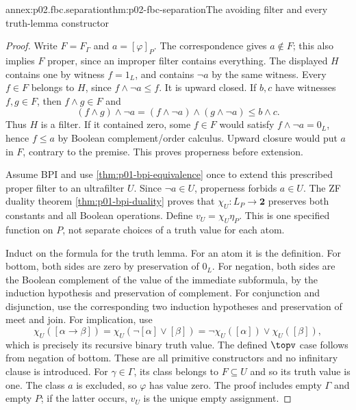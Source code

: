\begin{annexitem}{annex:p02.fbc.separation}{thm:p02-fbc-separation}{The avoiding filter and every truth-lemma constructor}
\begin{proof}
Write \(F=F_\Gamma\) and \(a=[\varphi]_P\).
The correspondence gives \(a\notin F\); this also implies \(F\)
proper, since an improper filter contains everything.
The displayed \(H\) contains one by witness \(f=1_L\), and contains
\(\neg a\) by the same witness. Every \(f\in F\) belongs to \(H\),
since \(f\wedge\neg a\leq f\).
It is upward closed. If \(b,c\) have witnesses \(f,g\in F\),
then \(f\wedge g\in F\) and
\[
 (f\wedge g)\wedge\neg a
        =(f\wedge\neg a)\wedge(g\wedge\neg a)\leq b\wedge c .
\]
Thus \(H\) is a filter.
If it contained zero, some \(f\in F\) would satisfy
\(f\wedge\neg a=0_L\), hence \(f\leq a\) by Boolean
complement/order calculus. Upward closure would put \(a\) in \(F\),
contrary to the premise. This proves properness before extension.

Assume BPI and use \cref{thm:p01-bpi-equivalence} once to extend
this prescribed proper filter to an ultrafilter \(U\).
Since \(\neg a\in U\), properness forbids \(a\in U\).
The ZF duality theorem \cref{thm:p01-bpi-duality} proves that
\(\chi_U:L_P\to\mathbf2\) preserves both constants and all
Boolean operations. Define \(v_U=\chi_U\eta_P\).
This is one specified function on \(P\), not separate choices
of a truth value for each atom.

Induct on the formula for the truth lemma.
For an atom it is the definition.
For bottom, both sides are zero by preservation of \(0_L\).
For negation, both sides are the Boolean complement of the value
of the immediate subformula, by the induction hypothesis and
preservation of complement.
For conjunction and disjunction, use the corresponding two
induction hypotheses and preservation of meet and join.
For implication, use
\[
 \chi_U([\alpha\to\beta])
     =\chi_U(\neg[\alpha]\vee[\beta])
     =\neg\chi_U([\alpha])\vee\chi_U([\beta]),
\]
which is precisely its recursive binary truth value.
The defined \(\topv\) case follows from negation of bottom.
These are all primitive constructors and no infinitary clause
is introduced.
For \(\gamma\in\Gamma\), its class belongs to \(F\subseteq U\)
and so its truth value is one. The class \(a\) is excluded,
so \(\varphi\) has value zero.
The proof includes empty \(\Gamma\) and empty \(P\);
if the latter occurs, \(v_U\) is the unique empty assignment.
\end{proof}
\end{annexitem}

